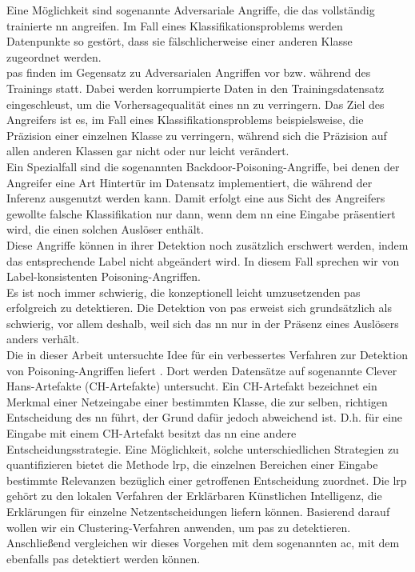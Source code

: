 \documentclass[twoside, 12pt,a4paper]{book}
\numberwithin{equation}{section}
\begin{document}
	\noindent Eine Möglichkeit sind sogenannte Adversariale Angriffe, die das vollständig trainierte \ac{nn} angreifen. Im Fall eines Klassifikationsproblems werden Datenpunkte so gestört, dass sie fälschlicherweise einer anderen Klasse zugeordnet werden. \\
	\acp{pa} finden im Gegensatz zu Adversarialen Angriffen vor bzw. während des Trainings statt. Dabei werden korrumpierte Daten in den Trainingsdatensatz eingeschleust, um die Vorhersagequalität eines \ac{nn} zu verringern.
	Das Ziel des Angreifers ist es, im Fall eines Klassifikationsproblems beispielsweise, die Präzision einer einzelnen Klasse zu verringern, während sich die Präzision auf allen anderen Klassen gar nicht oder nur leicht verändert.\\
	Ein Spezialfall sind die sogenannten Backdoor-Poisoning-Angriffe, bei denen der Angreifer eine Art Hintertür im Datensatz implementiert, die während der Inferenz ausgenutzt werden kann. Damit erfolgt eine aus Sicht des Angreifers gewollte falsche Klassifikation nur dann, wenn dem \ac{nn} eine Eingabe präsentiert wird, die einen solchen Auslöser enthält.\\
	Diese Angriffe können in ihrer Detektion noch zusätzlich erschwert werden, indem das entsprechende Label nicht abgeändert wird. In diesem Fall sprechen wir von Label-konsistenten Poisoning-Angriffen. \\
	 
	
	\noindent Es ist noch immer schwierig, die konzeptionell leicht umzusetzenden \acp{pa} erfolgreich zu detektieren.
	Die Detektion von \acp{pa} erweist sich grundsätzlich als schwierig, vor allem deshalb, weil sich das \ac{nn} nur in der Präsenz eines Auslösers anders verhält.	\\
	
	\noindent Die in dieser Arbeit untersuchte Idee für ein verbessertes Verfahren zur Detektion von Poisoning-Angriffen liefert \cite{unmaskingCH}. 
	Dort werden Datensätze auf sogenannte Clever Hans-Artefakte (CH-Artefakte) untersucht. Ein CH-Artefakt bezeichnet ein Merkmal einer Netzeingabe einer bestimmten Klasse, die zur selben, richtigen Entscheidung des \ac{nn} führt, der Grund dafür jedoch abweichend ist. D.h. für eine Eingabe mit einem CH-Artefakt besitzt das \ac{nn} eine andere Entscheidungsstrategie. Eine Möglichkeit, solche unterschiedlichen Strategien zu quantifizieren bietet die Methode \ac{lrp}, die einzelnen Bereichen einer Eingabe bestimmte Relevanzen bezüglich einer getroffenen Entscheidung zuordnet. Die \ac{lrp} gehört zu den lokalen Verfahren der Erklärbaren Künstlichen Intelligenz, die Erklärungen für einzelne Netzentscheidungen liefern können. Basierend darauf wollen wir ein Clustering-Verfahren anwenden, um \acp{pa} zu detektieren. Anschließend vergleichen wir dieses Vorgehen mit dem sogenannten \ac{ac}, mit dem ebenfalls \acp{pa} detektiert werden können. \\
	
\end{document}
